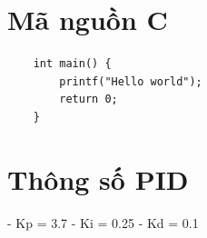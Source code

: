 \documentclass[12pt,a4paper]{report}
\begin{document}
    
    \tableofcontents
    \cleardoublepage 
    
    
    
    \appendix
    \section{Mã nguồn C}
    \begin{verbatim}
    int main() {
        printf("Hello world");
        return 0;
    }
    \end{verbatim}

    \section{Thông số PID}
    - Kp = 3.7  
    - Ki = 0.25  
    - Kd = 0.1
\end{document}
